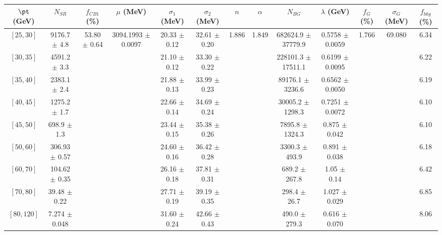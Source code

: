 \begin{tabular}{c||c|c|c|c|c|c|c|c|c|c|c||c}
$\pt$ (GeV) & $N_{SR}$ & $f_{CB1}$ (\%) & $\mu$ (MeV) & $\sigma_1$ (MeV) & $\sigma_2$ (MeV) & $n$ & $\alpha$ & $N_{BG}$ & $\lambda$ (GeV) & $f_G$ (\%) & $\sigma_G$ (MeV) & $f_{bkg}$ (\%) \\
\hline
$[25, 30]$ & 9176.7 $\pm$ 4.8 & \multirow{9}{*}{53.80 $\pm$ 0.64} & \multirow{9}{*}{3094.1993 $\pm$ 0.0097} & 20.33 $\pm$ 0.12 & 32.61 $\pm$ 0.20 & \multirow{9}{*}{1.886} & \multirow{9}{*}{1.849} & 682624.9 $\pm$ 37779.9 & 0.5758 $\pm$ 0.0059 & \multirow{9}{*}{1.766} & \multirow{9}{*}{69.080} & 6.34\\
$[30, 35]$ & 4591.2 $\pm$ 3.3 &  &  & 21.10 $\pm$ 0.12 & 33.30 $\pm$ 0.22 &  &  & 228101.3 $\pm$ 17511.1 & 0.6199 $\pm$ 0.0095 &  &  & 6.22\\
$[35, 40]$ & 2383.1 $\pm$ 2.4 &  &  & 21.88 $\pm$ 0.13 & 33.99 $\pm$ 0.23 &  &  & 89176.1 $\pm$ 3236.6 & 0.6562 $\pm$ 0.0050 &  &  & 6.19\\
$[40, 45]$ & 1275.2 $\pm$ 1.7 &  &  & 22.66 $\pm$ 0.14 & 34.69 $\pm$ 0.24 &  &  & 30005.2 $\pm$ 1298.3 & 0.7251 $\pm$ 0.0072 &  &  & 6.10\\
$[45, 50]$ & 698.9 $\pm$ 1.3 &  &  & 23.44 $\pm$ 0.15 & 35.38 $\pm$ 0.26 &  &  & 7895.8 $\pm$ 1324.3 & 0.875 $\pm$ 0.042 &  &  & 6.10\\
$[50, 60]$ & 306.93 $\pm$ 0.57 &  &  & 24.60 $\pm$ 0.16 & 36.42 $\pm$ 0.28 &  &  & 3300.3 $\pm$ 493.9 & 0.891 $\pm$ 0.038 &  &  & 6.18\\
$[60, 70]$ & 104.62 $\pm$ 0.35 &  &  & 26.16 $\pm$ 0.18 & 37.81 $\pm$ 0.31 &  &  & 689.2 $\pm$ 267.8 & 1.05 $\pm$ 0.14 &  &  & 6.42\\
$[70, 80]$ & 39.48 $\pm$ 0.22 &  &  & 27.71 $\pm$ 0.19 & 39.19 $\pm$ 0.35 &  &  & 298.4 $\pm$ 26.7 & 1.027 $\pm$ 0.029 &  &  & 6.85\\
$[80, 120]$ & 7.274 $\pm$ 0.048 &  &  & 31.60 $\pm$ 0.24 & 42.66 $\pm$ 0.43 &  &  & 490.0 $\pm$ 279.3 & 0.616 $\pm$ 0.070 &  &  & 8.06\\
\end{tabular}

